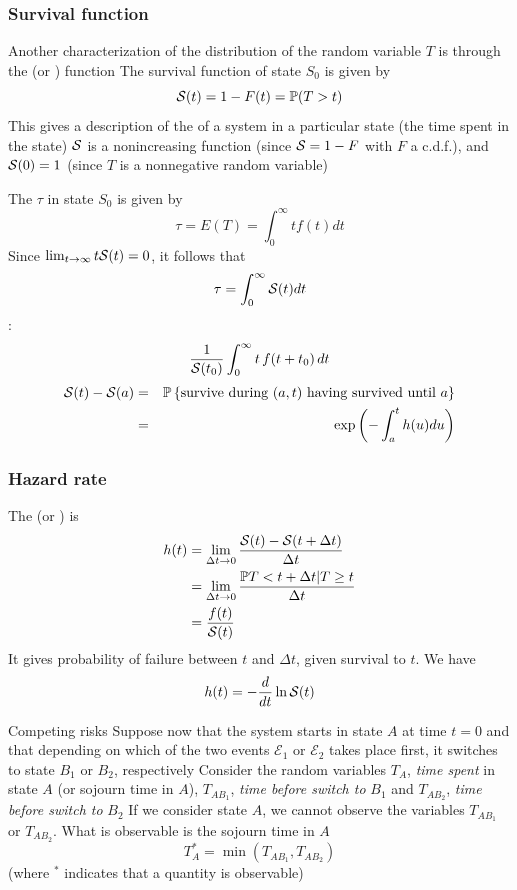 \documentclass[aspectratio=169]{beamer}\usepackage[]{graphicx}\usepackage[]{xcolor}
\begin{document}
\begin{frame}\frametitle{Survival function}
Another characterization of the distribution of the random variable $T$ is through the  (or ) function
\vfill
The survival function of state $S_0$ is given by 
\begin{equation}
  \S(t)=1-F(t)=\IP(T>t)
  \label{eq:survival}
\end{equation}
This gives a description of the  of a
system in a particular state (the time spent in the state)
\vfill
$\S$ is a nonincreasing function (since $\S=1-F$
with $F$ a c.d.f.), and
$\S(0)=1$ (since $T$ is a nonnegative random variable)
\end{frame}

\begin{frame}
The  $\tau$ in state $S_0$ is given by
\[
\tau=E(T)=\int_0^\infty tf(t)dt
\]
Since $\lim_{t\to\infty}t\S(t)=0$, it follows that 
\[
\tau=\int_0^\infty \S(t)dt
\]
\vfill
{}:
\[
\frac{1}{\S(t_0)} \int_0^{\infty} t\,f(t+t_0)\,dt 
\]
\vfill
\begin{eqnarray*}
\S(t)-\S(a)&=&\IP\left\{\textrm{survive during }
 (a,t)\textrm{ having survived until }a\right\} \\
&=& \exp\left(-\int_a^t h(u)du\right)
\end{eqnarray*}
\end{frame}

\begin{frame}\frametitle{Hazard rate}
The  (or ) is
\begin{align*}
h(t) &= \lim_{\Delta t\to 0}\frac{\S(t)-\S(t+\Delta t)}{\Delta t} \\
& = \lim_{\Delta t\to 0} \frac{\IP{ T<t+\Delta t | T\geq
t}}{\Delta t} \\
&= \frac{f(t)}{\S(t)}
\end{align*}
It gives probability of failure between $t$ and $\Delta t$, given survival to $t$.
\vfill
We have
\[
h(t)=-\frac{d}{dt}\ln\S(t)
\]
\end{frame}

\begin{frame}{Competing risks}
Suppose now that the system starts in state $A$ at time $t=0$ and that depending on which of the two events $\mathcal{E}_1$ or $\mathcal{E}_2$ takes place first, it switches to state $B_1$ or $B_2$, respectively
\vfill
Consider the random variables $T_A$, \emph{time spent} in state $A$ (or sojourn time in $A$), $T_{AB_1}$, \emph{time before switch to} $B_1$ and $T_{AB_2}$, \emph{time before switch to} $B_2$
\vfill
If we consider state $A$, we cannot observe the variables $T_{AB_1}$ or $T_{AB_2}$. What is observable is the sojourn time in $A$
\[
T^*_A=\min\left( T_{AB_1},T_{AB_2} \right)
\]
(where $^*$ indicates that a quantity is observable)
\end{frame}
\end{document}
